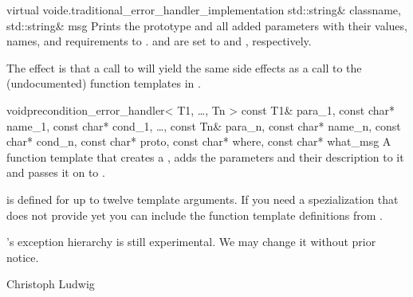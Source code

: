 \BASIC

\begin{cfcode}{virtual void}{e.traditional_error_handler_implementation}{
    std::string& classname, std::string& msg}
  Prints the prototype and all added parameters with their values, names, and
  requirements to .  and  are set to
   and , respectively.

  The effect is that a call to  will yield
  the same side effects as a call to the (undocumented) function templates
   in .
\end{cfcode}

\begin{fcode}{void}{precondition_error_handler< T1, \dots, Tn >}{
    const T1& para_1, const char* name_1, const char* cond_1,
    \dots,
    const Tn& para_n, const char* name_n, const char* cond_n,
    const char* proto, const char* where, const char* what_msg}
  A function template that creates a , adds the
  parameters and their description to it and passes it on to
  . 

   is defined for up to twelve template
  arguments. If you need a spezialization that \LiDIA does not provide yet you
  can include the function template definitions from
  . 
\end{fcode}

\SEEALSO
{}



\WARNINGS

\LiDIA's exception hierarchy is still experimental. We may change it without
prior notice.


\AUTHOR

Christoph Ludwig


